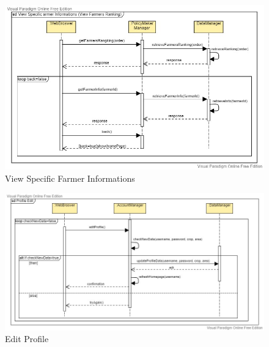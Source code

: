 \documentclass[table, 12pt]{article}
\begin{document}
\begin{center}
    \begin{figure}[H]
        \includegraphics[scale=0.42, center]{assets/SequenceDiagram/SpecificFarmerInfo.jpg}
        \caption{View Specific Farmer Informations}
        \label{fig: specificFarmerInfo}
    \end{figure}
\end{center}

\begin{center}
    \begin{figure}[H]
        \includegraphics[scale=0.42, center]{assets/SequenceDiagram/ProfileEdit.jpg}
        \caption{Edit Profile}
        \label{fig: profileEdit}
    \end{figure}
\end{center}
\end{document}
